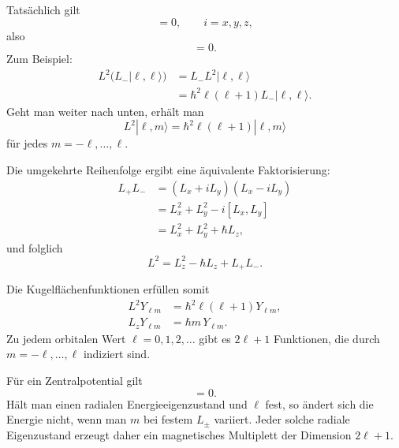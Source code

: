 Tatsächlich gilt
\begin{equation}
[L^2,L_i]=0,
\qquad i=x,y,z,
\end{equation}
also
\begin{equation}
[L^2,L_\pm]=0.
\end{equation}
Zum Beispiel:
\begin{align}
L^2\bigl(L_-|\ell,\ell\rangle\bigr)
&=L_-L^2|\ell,\ell\rangle \\
&=\hbar^2\ell(\ell+1)L_-|\ell,\ell\rangle.
\end{align}
Geht man weiter nach unten, erhält man
\begin{equation}
L^2|\ell,m\rangle
=\hbar^2\ell(\ell+1)|\ell,m\rangle
\end{equation}
für jedes \(m=-\ell,\ldots,\ell\).

Die umgekehrte Reihenfolge ergibt eine äquivalente Faktorisierung:
\begin{align}
L_+L_-
&=(L_x+iL_y)(L_x-iL_y) \\
&=L_x^2+L_y^2-i[L_x,L_y] \\
&=L_x^2+L_y^2+\hbar L_z,
\end{align}
und folglich
\begin{equation}
L^2=L_z^2-\hbar L_z+L_+L_-.
\end{equation}

\begin{classroomqa}\end{classroomqa}

Die Kugelflächenfunktionen erfüllen somit
\begin{align}
L^2Y_{\ell m}
&=\hbar^2\ell(\ell+1)Y_{\ell m}, \\
L_zY_{\ell m}
&=\hbar m\,Y_{\ell m}.
\end{align}
Zu jedem orbitalen Wert \(\ell=0,1,2,\ldots\) gibt es \(2\ell+1\) Funktionen, die durch \(m=-\ell,\ldots,\ell\) indiziert sind.

Für ein Zentralpotential gilt
\begin{equation}
[H,L_i]=0.
\end{equation}
Hält man einen radialen Energieeigenzustand und \(\ell\) fest, so ändert sich die Energie nicht, wenn man \(m\) bei festem \(L_\pm\) variiert. Jeder solche radiale Eigenzustand erzeugt daher ein magnetisches Multiplett der Dimension \(2\ell+1\).

